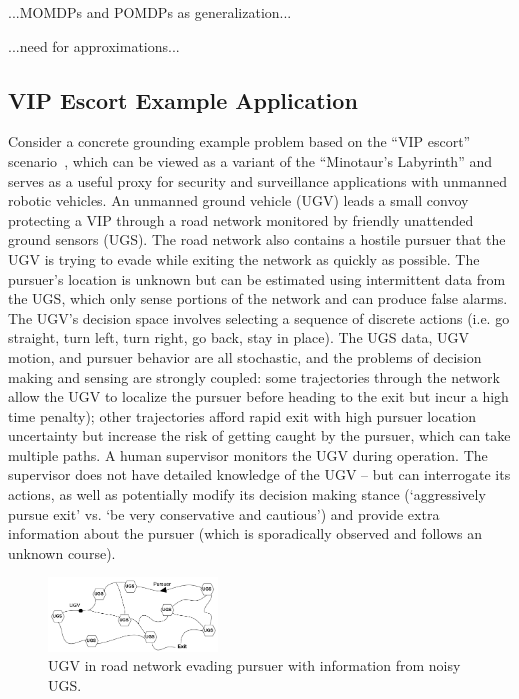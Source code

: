 ...MOMDPs and POMDPs as generalization...

...need for approximations...


\subsection{VIP Escort Example Application} \label{sec:vip_escort}
Consider a concrete grounding example problem based on the ``VIP escort'' scenario~\cite{Humphrey2012-lr}, which can be viewed as a variant of the ``Minotaur's Labyrinth'' and serves as a useful proxy for security and surveillance applications with unmanned robotic vehicles. An unmanned ground vehicle (UGV) leads a small convoy protecting a VIP through a road network monitored by friendly unattended ground sensors (UGS). The road network also contains a hostile pursuer that the UGV is trying to evade while exiting the network as quickly as possible. The pursuer's location is unknown but can be estimated using intermittent data from the UGS, which only sense portions of the network and can produce false alarms. The UGV's decision space involves selecting a sequence of discrete actions (i.e. go straight, turn left, turn right, go back, stay in place). The UGS data, UGV motion, and pursuer behavior are all stochastic, and the problems of decision making and sensing are strongly coupled: some trajectories through the network allow the UGV to localize the pursuer before heading to the exit but incur a high time penalty); other trajectories afford rapid exit with high pursuer location uncertainty but increase the risk of getting caught by the pursuer, which can take multiple paths. A human supervisor monitors the UGV during operation. The supervisor does not have detailed knowledge of the UGV -- but can interrogate its actions, as well as potentially modify its decision making stance (`aggressively pursue exit' vs. `be very conservative and cautious') and provide extra information about the pursuer (which is sporadically observed and follows an unknown course). 
    
	\begin{figure}[t]%
    	\centering
     	\includegraphics[width=0.4\textwidth]{Figures/RoadNet}
    	\caption{UGV in road network evading pursuer with information from noisy UGS.} 
        \label{fig:RoadNet}
        \vspace{-0.2 in}
    \end{figure}


